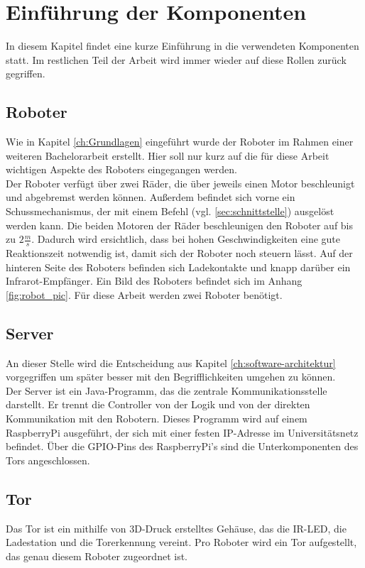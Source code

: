 \chapter{Einführung der Komponenten}

In diesem Kapitel findet eine kurze Einführung in die verwendeten Komponenten statt. Im restlichen Teil der Arbeit wird immer wieder auf diese Rollen zurück gegriffen.

\section{Roboter}
Wie in Kapitel \ref{ch:Grundlagen} eingeführt wurde der Roboter im Rahmen einer weiteren Bachelorarbeit erstellt. Hier soll nur kurz auf die für diese Arbeit wichtigen Aspekte des Roboters eingegangen werden. \\
Der Roboter verfügt über zwei Räder, die über jeweils einen Motor beschleunigt und abgebremst werden können. Außerdem befindet sich vorne ein Schussmechanismus, der mit einem Befehl (vgl. \ref{sec:schnittstelle}) ausgelöst werden kann. Die beiden Motoren der Räder beschleunigen den Roboter auf bis zu $2\frac{m}{s}$. Dadurch wird ersichtlich, dass bei hohen Geschwindigkeiten eine gute Reaktionszeit notwendig ist, damit sich der Roboter noch steuern lässt. Auf der hinteren Seite des Roboters befinden sich Ladekontakte und knapp darüber ein Infrarot-Empfänger. Ein Bild des Roboters befindet sich im Anhang \ref{fig:robot_pic}. Für diese Arbeit werden zwei Roboter benötigt.

\section{Server}
An dieser Stelle wird die Entscheidung aus Kapitel \ref{ch:software-architektur} vorgegriffen um später besser mit den Begrifflichkeiten umgehen zu können. \\
Der Server ist ein Java-Programm, das die zentrale Kommunikationsstelle darstellt. Er trennt die Controller von der Logik und von der direkten Kommunikation mit den Robotern. Dieses Programm wird auf einem RaspberryPi ausgeführt, der sich mit einer festen IP-Adresse im Universitätsnetz befindet. Über die GPIO-Pins des RaspberryPi's sind die Unterkomponenten des Tors angeschlossen.

\section{Tor}
Das Tor ist ein mithilfe von 3D-Druck erstelltes Gehäuse, das die IR-LED, die Ladestation und die Torerkennung vereint. Pro Roboter wird ein Tor aufgestellt, das genau diesem Roboter zugeordnet ist.

